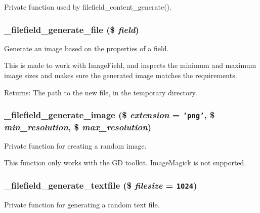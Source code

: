 Private function used by filefield\_\-content\_\-generate(). \hypertarget{filefield_8devel_8inc_d00f635cf5efbb788362e6da3af48427}{
\subsubsection[{\_\-filefield\_\-generate\_\-file}]{\setlength{\rightskip}{0pt plus 5cm}\_\-filefield\_\-generate\_\-file (\$ {\em field})}}
\label{filefield_8devel_8inc_d00f635cf5efbb788362e6da3af48427}


Generate an image based on the properties of a field.

This is made to work with ImageField, and inspects the minimum and maximum image sizes and makes sure the generated image matches the requirements.

\begin{Desc}
\item[Returns:]The path to the new file, in the temporary directory. \end{Desc}
\hypertarget{filefield_8devel_8inc_d445fcfee3758c9ddb23429c42c29597}{
\subsubsection[{\_\-filefield\_\-generate\_\-image}]{\setlength{\rightskip}{0pt plus 5cm}\_\-filefield\_\-generate\_\-image (\$ {\em extension} = {\tt 'png'}, \/  \$ {\em min\_\-resolution}, \/  \$ {\em max\_\-resolution})}}
\label{filefield_8devel_8inc_d445fcfee3758c9ddb23429c42c29597}


Private function for creating a random image.

This function only works with the GD toolkit. ImageMagick is not supported. \hypertarget{filefield_8devel_8inc_705cf7c67b9e42aae82a3b208449ac6a}{
\subsubsection[{\_\-filefield\_\-generate\_\-textfile}]{\setlength{\rightskip}{0pt plus 5cm}\_\-filefield\_\-generate\_\-textfile (\$ {\em filesize} = {\tt 1024})}}
\label{filefield_8devel_8inc_705cf7c67b9e42aae82a3b208449ac6a}


Private function for generating a random text file. 